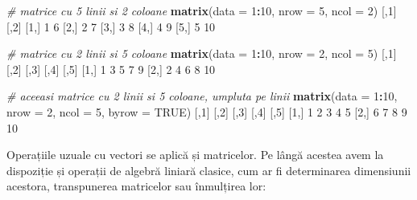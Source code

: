 \documentclass[]{article}
\newenvironment{Shaded}{\begin{snugshade}}{\end{snugshade}}
\newcommand{\CommentTok}[1]{\textcolor[rgb]{0.56,0.35,0.01}{\textit{#1}}}
\newcommand{\DataTypeTok}[1]{\textcolor[rgb]{0.13,0.29,0.53}{#1}}
\newcommand{\DecValTok}[1]{\textcolor[rgb]{0.00,0.00,0.81}{#1}}
\newcommand{\KeywordTok}[1]{\textcolor[rgb]{0.13,0.29,0.53}{\textbf{#1}}}
\newcommand{\NormalTok}[1]{#1}
\newcommand{\OperatorTok}[1]{\textcolor[rgb]{0.81,0.36,0.00}{\textbf{#1}}}
\newcommand{\OtherTok}[1]{\textcolor[rgb]{0.56,0.35,0.01}{#1}}
\begin{document}
\begin{Shaded}
\begin{Highlighting}[]
\CommentTok{# matrice cu 5 linii si 2 coloane}
\KeywordTok{matrix}\NormalTok{(}\DataTypeTok{data =} \DecValTok{1}\OperatorTok{:}\DecValTok{10}\NormalTok{,}
       \DataTypeTok{nrow =} \DecValTok{5}\NormalTok{,}
       \DataTypeTok{ncol =} \DecValTok{2}\NormalTok{)}
\NormalTok{     [,}\DecValTok{1}\NormalTok{] [,}\DecValTok{2}\NormalTok{]}
\NormalTok{[}\DecValTok{1}\NormalTok{,]    }\DecValTok{1}    \DecValTok{6}
\NormalTok{[}\DecValTok{2}\NormalTok{,]    }\DecValTok{2}    \DecValTok{7}
\NormalTok{[}\DecValTok{3}\NormalTok{,]    }\DecValTok{3}    \DecValTok{8}
\NormalTok{[}\DecValTok{4}\NormalTok{,]    }\DecValTok{4}    \DecValTok{9}
\NormalTok{[}\DecValTok{5}\NormalTok{,]    }\DecValTok{5}   \DecValTok{10}

\CommentTok{# matrice cu 2 linii si 5 coloane}
\KeywordTok{matrix}\NormalTok{(}\DataTypeTok{data =} \DecValTok{1}\OperatorTok{:}\DecValTok{10}\NormalTok{,}
       \DataTypeTok{nrow =} \DecValTok{2}\NormalTok{,}
       \DataTypeTok{ncol =} \DecValTok{5}\NormalTok{)}
\NormalTok{     [,}\DecValTok{1}\NormalTok{] [,}\DecValTok{2}\NormalTok{] [,}\DecValTok{3}\NormalTok{] [,}\DecValTok{4}\NormalTok{] [,}\DecValTok{5}\NormalTok{]}
\NormalTok{[}\DecValTok{1}\NormalTok{,]    }\DecValTok{1}    \DecValTok{3}    \DecValTok{5}    \DecValTok{7}    \DecValTok{9}
\NormalTok{[}\DecValTok{2}\NormalTok{,]    }\DecValTok{2}    \DecValTok{4}    \DecValTok{6}    \DecValTok{8}   \DecValTok{10}

\CommentTok{# aceeasi matrice cu 2 linii si 5 coloane, umpluta pe linii }
\KeywordTok{matrix}\NormalTok{(}\DataTypeTok{data =} \DecValTok{1}\OperatorTok{:}\DecValTok{10}\NormalTok{,}
       \DataTypeTok{nrow =} \DecValTok{2}\NormalTok{,}
       \DataTypeTok{ncol =} \DecValTok{5}\NormalTok{,}
       \DataTypeTok{byrow =} \OtherTok{TRUE}\NormalTok{)}
\NormalTok{     [,}\DecValTok{1}\NormalTok{] [,}\DecValTok{2}\NormalTok{] [,}\DecValTok{3}\NormalTok{] [,}\DecValTok{4}\NormalTok{] [,}\DecValTok{5}\NormalTok{]}
\NormalTok{[}\DecValTok{1}\NormalTok{,]    }\DecValTok{1}    \DecValTok{2}    \DecValTok{3}    \DecValTok{4}    \DecValTok{5}
\NormalTok{[}\DecValTok{2}\NormalTok{,]    }\DecValTok{6}    \DecValTok{7}    \DecValTok{8}    \DecValTok{9}   \DecValTok{10}
\end{Highlighting}
\end{Shaded}

Operațiile uzuale cu vectori se aplică și matricelor. Pe lângă acestea
avem la dispoziție și operații de algebră liniară clasice, cum ar fi
determinarea dimensiunii acestora, transpunerea matricelor sau
înmulțirea lor:
\end{document}
